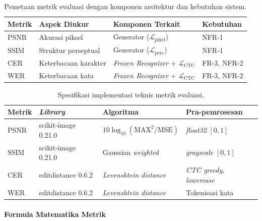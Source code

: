 \documentclass[12pt,a4paper]{article}
\begin{document}
\begin{table}[H]
  \caption[Pemetaan metrik evaluasi dengan komponen arsitektur]{Pemetaan metrik evaluasi dengan komponen arsitektur dan kebutuhan sistem.}
  \label{tab:metric-component-mapping}
  \small

  \begin{tabularx}{\textwidth}{|l|X|X|l|}
    \hline
    \textbf{Metrik} & \textbf{Aspek Diukur} & \textbf{Komponen Terkait}                      & \textbf{Kebutuhan} \\
    \hline
    PSNR            & Akurasi piksel        & Generator ($\mathcal{L}_{\text{pixel}}$)       & NFR-1              \\
    SSIM            & Struktur perseptual   & Generator ($\mathcal{L}_{\text{perc}}$)        & NFR-1              \\
    CER             & Keterbacaan karakter  & \textit{Frozen Recognizer} + $\mathcal{L}_{\text{CTC}}$ & FR-3, NFR-2        \\
    WER             & Keterbacaan kata      & \textit{Frozen Recognizer} + $\mathcal{L}_{\text{CTC}}$ & FR-3, NFR-2        \\
    \hline
  \end{tabularx}
\end{table}

\begin{table}[H]
  \caption[Spesifikasi implementasi metrik evaluasi]{Spesifikasi implementasi teknis metrik evaluasi.}
  \label{tab:metric-implementation}
  \small

  \begin{tabularx}{\textwidth}{|l|l|X|X|}
    \hline
    \textbf{Metrik} & \textbf{\textit{Library}} & \textbf{Algoritma} & \textbf{Pra-pemrosesan} \\
    \hline
    PSNR & scikit-image 0.21.0 & $10\log_{10}(\text{MAX}^2/\text{MSE})$ & \textit{float32} $[0,1]$ \\
    SSIM & scikit-image 0.21.0 & Gaussian \textit{weighted} & \textit{grayscale} $[0,1]$ \\
    CER  & editdistance 0.6.2  & \textit{Levenshtein distance} & \textit{CTC greedy}, \textit{lowercase} \\
    WER  & editdistance 0.6.2  & \textit{Levenshtein distance} & Tokenisasi kata \\
    \hline
  \end{tabularx}
\end{table}

\paragraph{Formula Matematika Metrik}
\end{document}
